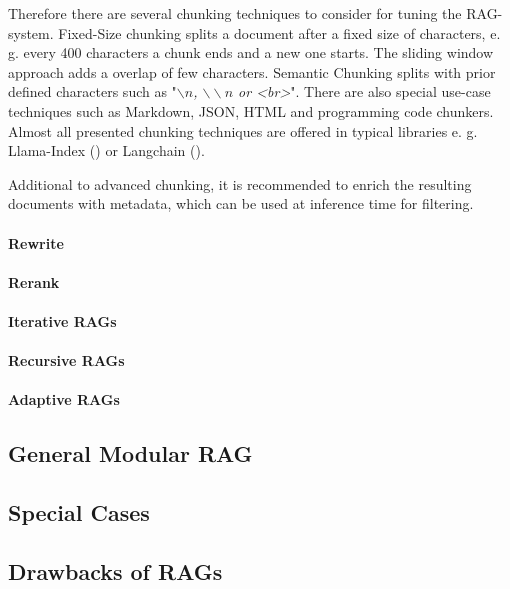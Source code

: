 Therefore there are several chunking techniques to consider for tuning the RAG-system. Fixed-Size chunking splits a document after a fixed size of characters, e. g. every 400 characters a chunk ends and a new one starts. The sliding window approach adds a overlap of few characters. Semantic Chunking splits with prior defined characters such as "\textit{$\backslash n$, $\backslash\backslash n$ or <br>}". There are also special use-case techniques such as Markdown, JSON, HTML and programming code chunkers. Almost all presented chunking techniques are offered in typical libraries e. g. Llama-Index (\citet{Liu_LlamaIndex_2022}) or Langchain (\citeauthor{Chase_LangChain_2022}).

Additional to advanced chunking, it is recommended to enrich the resulting documents with metadata, which can be used at inference time for filtering. 


\paragraph{Rewrite}
\label{sec:rewrite}

\paragraph{Rerank}
\label{sec:rerank}

\paragraph{Iterative RAGs}
\label{sec:iterative}

\paragraph{Recursive RAGs}
\label{sec:recursive}

\paragraph{Adaptive RAGs}
\label{sec:adaptive}

\subsection{General Modular RAG}
\label{sec:modular_rag}

\subsection{Special Cases}
\label{sec:special_cases}

\subsection{Drawbacks of RAGs}
\label{sec:drawbacks}

